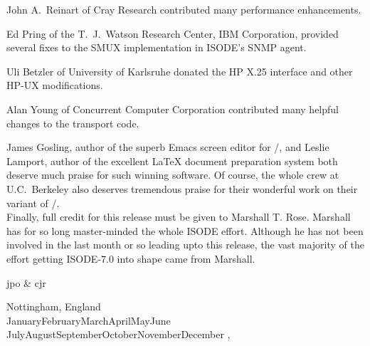John A.~Reinart
of Cray Research contributed many performance enhancements.

Ed Pring
of the T.~J.~Watson Research Center, IBM Corporation,
provided several fixes to the SMUX implementation in ISODE's SNMP
agent.

Uli Betzler
of University of Karlsruhe
donated the HP X.25 interface and other HP-UX modifications.

Alan Young
of Concurrent Computer Corporation contributed many helpful changes to
the transport code.

James Gosling,
author of the superb Emacs screen editor for \unix/,
and
Leslie Lamport,
author of the excellent \LaTeX{} document preparation system
both deserve much praise for such winning software.
Of course,
the whole crew at U.C.~Berkeley
also deserves tremendous praise for their wonderful work on their variant of
\unix/.\\[1.5ex]

Finally, full credit for this release must be given to 
Marshall T. Rose.
Marshall has for so long master-minded the whole ISODE effort.
Although he has not been involved in the last month or so leading upto
this release, the vast majority of the effort getting ISODE-7.0 into 
shape came from Marshall.

\vspace{0.25in}
{\raggedleft jpo \& cjr \par}
{\raggedright Nottingham, England\\
\ifcase\month
    \number\month\or
    January\or February\or March\or April\or May\or June\or
    July\or August\or September\or October\or November\or December\else
\number\month\fi,
{\oldstyle\number\year}\par}
